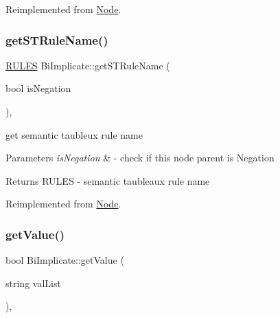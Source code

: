 Reimplemented from \hyperlink{class_node_a1009cb6d84206c2b5eaa86580da59a7c}{Node}.

\mbox{\label{class_bi_implicate_a3ca1a9b3fd1805b56b72def494179ea3}} 
\subsubsection{\texorpdfstring{get\+S\+T\+Rule\+Name()}{getSTRuleName()}}
{\footnotesize\ttfamily \hyperlink{proposition_2tableaux_2enum_8h_a70c93904c6a27d228050f922eb4fc3b8}{R\+U\+L\+ES} Bi\+Implicate\+::get\+S\+T\+Rule\+Name (\begin{DoxyParamCaption}\item[{bool}]{is\+Negation }\end{DoxyParamCaption})\hspace{0.3cm}{\ttfamily [override]}, {\ttfamily [virtual]}}



get semantic taubleux rule name 


\begin{DoxyParams}{Parameters}
{\em is\+Negation} & -\/ check if this node parent is Negation \\
\hline
\end{DoxyParams}
\begin{DoxyReturn}{Returns}
R\+U\+L\+ES -\/ semantic taubleaux rule name 
\end{DoxyReturn}


Reimplemented from \hyperlink{class_node_a25b6581950988c2536a392a6874c8072}{Node}.

\mbox{\label{class_bi_implicate_ac7cb17f1414705f9a1d9df83793b0d58}} 
\subsubsection{\texorpdfstring{get\+Value()}{getValue()}}
{\footnotesize\ttfamily bool Bi\+Implicate\+::get\+Value (\begin{DoxyParamCaption}\item[{string}]{val\+List }\end{DoxyParamCaption})\hspace{0.3cm}{\ttfamily [override]}, {\ttfamily [virtual]}}



